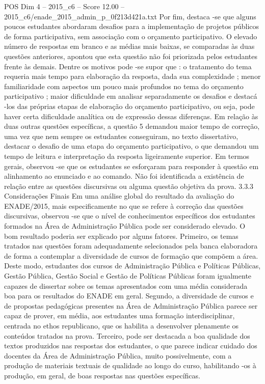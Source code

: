 \begin{textsample}{POS Dim 4 – 2015\_c6 – Score 12.00 – 2015\_c6/enade\_2015\_admin\_p\_0f213d421a.txt}
Por fim, destaca -se que alguns poucos estudantes abordaram desafios para a implementação de projetos públicos de forma participativa, sem associação com o orçamento participativo.
O elevado número de respostas em branco e as médias mais baixas, se comparadas às duas questões anteriores, apontou que esta questão não foi priorizada pelos estudantes frente às demais.
Dentre os motivos pode -se supor que : o tratamento do tema requeria mais tempo para elaboração da resposta, dada sua complexidade ; menor familiaridade com aspectos um pouco mais profundos no tema do orçamento participativo ; maior dificuldade em analisar separadamente os desafios e destacá -los das próprias etapas de elaboração do orçamento participativo, ou seja, pode haver certa dificuldade analítica ou de expressão dessas diferenças.
Em relação às duas outras questões específicas, a questão 5 demandou maior tempo de correção, uma vez que nem sempre os estudantes conseguiram, no texto dissertativo, destacar o desafio de uma etapa do orçamento participativo, o que demandou um tempo de leitura e interpretação da resposta ligeiramente superior.
Em termos gerais, observou -se que os estudantes se esforçaram para responder à questão em alinhamento ao enunciado e ao comando.
Não foi identificada a existência de relação entre as questões discursivas ou alguma questão objetiva da prova. 3.3.3 Considerações Finais Em uma análise global do resultado da avaliação do ENADE/2015, mais especificamente no que se refere à correção das questões discursivas, observou -se que o nível de conhecimentos específicos dos estudantes formados na Área de Administração Pública pode ser considerado elevado.
O bom resultado poderia ser explicado por alguns fatores.
Primeiro, os temas tratados nas questões foram adequadamente selecionados pela banca elaboradora de forma a contemplar a diversidade de cursos de formação que compõem a área.
Deste modo, estudantes dos cursos de Administração Pública e Políticas Públicas, Gestão Pública, Gestão Social e Gestão de Políticas Públicas foram igualmente capazes de dissertar sobre os temas apresentados com uma média considerada boa para os resultados do ENADE em geral.
Segundo, a diversidade de cursos e de propostas pedagógicas presentes na Área de Administração Pública parece ser capaz de prover, em média, aos estudantes uma formação interdisciplinar, centrada no ethos republicano, que os habilita a desenvolver plenamente os conteúdos tratados na prova.
Terceiro, pode ser destacada a boa qualidade dos textos produzidos nas respostas dos estudantes, o que parece indicar cuidado dos docentes da Área de Administração Pública, muito possivelmente, com a produção de materiais textuais de qualidade ao longo do curso, habilitando -os à produção, em geral, de boas respostas nas questões específicas.

\end{textsample}
